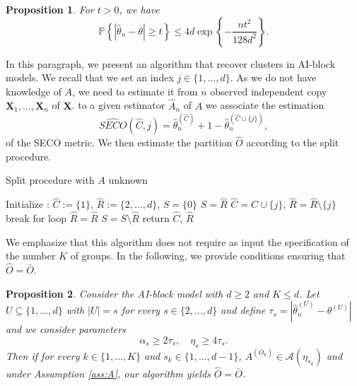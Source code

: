 \documentclass[11pt]{article}
\newtheorem{proposition}{Proposition}
\begin{document}
	\begin{proposition}
	\label{prop:concentration_inequality}
		For $t >0$, we have
		\begin{equation*}
			\mathbb{P}\left\{ |\hat{\theta}_n - \theta | \geq t \right\} \leq 4 d \exp\left\{ - \frac{nt^2}{128d^2}\right\}.
		\end{equation*}
	\end{proposition}
	
	In this paragraph, we present an algorithm that recover clusters in AI-block models. We recall that we set an index $j \in \{1,\dots,d\}$. As we do not have knowledge of $A$, we need to estimate it from $n$ observed independent copy $\textbf{X}_1, \dots, \textbf{X}_n$ of $\textbf{X}$. to a given estimator $\hat{A}_n$ of $A$ we associate the estimation 
	\begin{equation*}
		\widehat{SECO}(\hat{C}, j) = \hat{\theta}^{(\hat{C})}_n + 1 - \hat{\theta}^{(\hat{C} \cup \{j\})}_n,
	\end{equation*}
	of the SECO metric. We then estimate the partition $\hat{O}$ according to the split procedure.
	\begin{algorithm}

\caption{Split procedure with $A$ unknown}

\begin{algorithmic}[1]
    \State Initialize : $\hat{C} := \{1\}$, $\hat{R} :=  \{2, \dots, d\}$, $S = \{0\}$
    		\State $S = \hat{R}$
    				\State $\hat{C} = \hat{C} \cup \{j\}$, $\hat{R} = \hat{R} \setminus \{j\}$
    				\State break for loop
    			\Else{}
    				\State $\hat{R} = \hat{R}$
    			\EndIf
    			\State $S = S \setminus \hat{R}$
    		\EndFor
    \EndWhile
    \State return $\hat{C}$, $\hat{R}$
\EndProcedure
\end{algorithmic}
\label{alg:rec_pratic}
\end{algorithm}
	We emphasize that this algorithm does not require as input the specification of the number $K$ of groups. In the following, we provide conditions ensuring that $\hat{O} = \bar{O}$.
	\begin{proposition}
		\label{prop:exact_recovery}
		Consider the AI-block model with $d \geq 2$ and $K \leq d$. Let $U \subseteq \{1,\dots,d\}$ with $|U| = s$ for every $s \in \{2,\dots,d\}$ and define $\tau_s = |\hat{\theta}_n^{(U)} - \theta^{(U)}|$ and we consider parameters
		\begin{equation}
			\label{eq:condition_consistent_recovery}
			\alpha_s \geq 2 \tau_s, \quad \eta_s \geq 4 \tau_s.
		\end{equation}
		Then if for every $k \in \{1,\dots, K\}$ and $s_k \in \{1, \dots, d-1\}$, $A^{(\bar{O}_k)} \in \mathcal{A}(\eta_{s_k})$ and under Assumption \ref{ass:A}, our algorithm yields $\hat{O} = \bar{O}$.
	\end{proposition}
	
\end{document}
